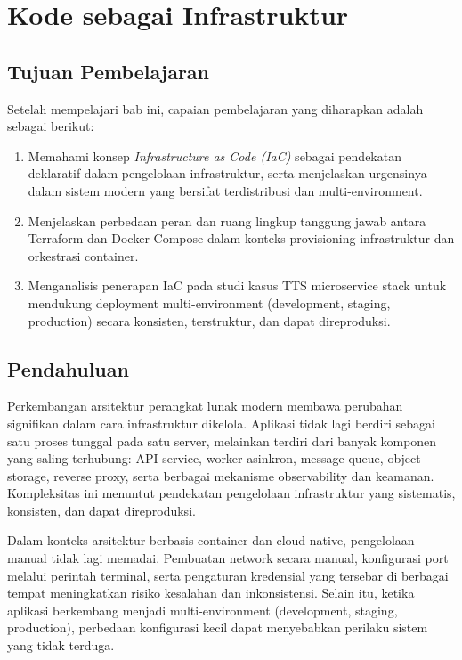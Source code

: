 \chapter{Kode sebagai Infrastruktur}
 
\section*{Tujuan Pembelajaran}

Setelah mempelajari bab ini, capaian pembelajaran yang diharapkan adalah sebagai berikut:

\begin{enumerate}
    \item Memahami konsep \textit{Infrastructure as Code (IaC)} sebagai pendekatan deklaratif dalam pengelolaan infrastruktur, serta menjelaskan urgensinya dalam sistem modern yang bersifat terdistribusi dan multi-environment.
    
    \item Menjelaskan perbedaan peran dan ruang lingkup tanggung jawab antara Terraform dan Docker Compose dalam konteks provisioning infrastruktur dan orkestrasi container.
    
    \item Menganalisis penerapan IaC pada studi kasus TTS microservice stack untuk mendukung deployment multi-environment (development, staging, production) secara konsisten, terstruktur, dan dapat direproduksi.
\end{enumerate}



\section{Pendahuluan}

Perkembangan arsitektur perangkat lunak modern membawa perubahan signifikan dalam cara infrastruktur dikelola. Aplikasi tidak lagi berdiri sebagai satu proses tunggal pada satu server, melainkan terdiri dari banyak komponen yang saling terhubung: API service, worker asinkron, message queue, object storage, reverse proxy, serta berbagai mekanisme observability dan keamanan. Kompleksitas ini menuntut pendekatan pengelolaan infrastruktur yang sistematis, konsisten, dan dapat direproduksi.

Dalam konteks arsitektur berbasis container dan cloud-native, pengelolaan manual tidak lagi memadai. Pembuatan network secara manual, konfigurasi port melalui perintah terminal, serta pengaturan kredensial yang tersebar di berbagai tempat meningkatkan risiko kesalahan dan inkonsistensi. Selain itu, ketika aplikasi berkembang menjadi multi-environment (development, staging, production), perbedaan konfigurasi kecil dapat menyebabkan perilaku sistem yang tidak terduga.

